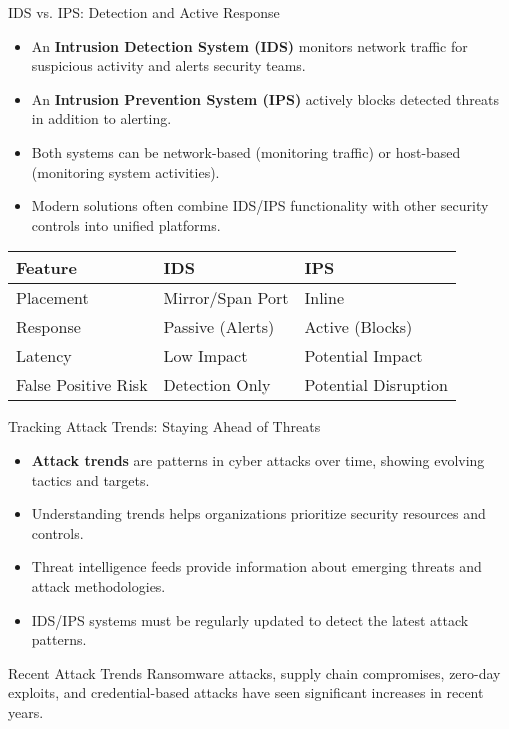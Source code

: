 \documentclass{beamer}
\begin{document}
    \begin{frame}{IDS vs. IPS: Detection and Active Response}
        \begin{itemize}
            \item An \textbf{Intrusion Detection System (IDS)} monitors network traffic for suspicious activity and alerts security teams.
            \item An \textbf{Intrusion Prevention System (IPS)} actively blocks detected threats in addition to alerting.
            \item Both systems can be network-based (monitoring traffic) or host-based (monitoring system activities).
            \item Modern solutions often combine IDS/IPS functionality with other security controls into unified platforms.
        \end{itemize}
        
        \begin{tabular}{lll}
        \textbf{Feature} & \textbf{IDS} & \textbf{IPS} \\
        \hline
        Placement & Mirror/Span Port & Inline \\
        Response & Passive (Alerts) & Active (Blocks) \\
        Latency & Low Impact & Potential Impact \\
        False Positive Risk & Detection Only & Potential Disruption \\
        \end{tabular}
        \end{frame}
        
        \begin{frame}{Tracking Attack Trends: Staying Ahead of Threats}
        \begin{itemize}
            \item \textbf{Attack trends} are patterns in cyber attacks over time, showing evolving tactics and targets.
            \item Understanding trends helps organizations prioritize security resources and controls.
            \item Threat intelligence feeds provide information about emerging threats and attack methodologies.
            \item IDS/IPS systems must be regularly updated to detect the latest attack patterns.
        \end{itemize}
        
        \begin{alertblock}{Recent Attack Trends}
        Ransomware attacks, supply chain compromises, zero-day exploits, and credential-based attacks have seen significant increases in recent years.
        \end{alertblock}
        \end{frame}
        
\end{document}

